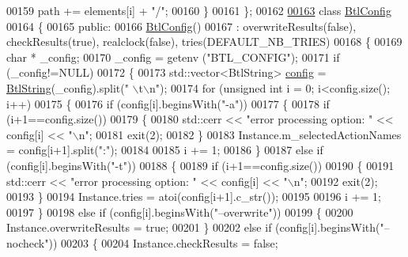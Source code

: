 \begin{DoxyCode}
00159             path += elements[i] + \textcolor{stringliteral}{"/"};
00160     \}
00161 \};
00162 
\hyperlink{class_btl_config}{00163} \textcolor{keyword}{class }\hyperlink{class_btl_config}{BtlConfig}
00164 \{
00165 \textcolor{keyword}{public}:
00166   \hyperlink{class_btl_config}{BtlConfig}()
00167     : overwriteResults(\textcolor{keyword}{false}), checkResults(\textcolor{keyword}{true}), realclock(\textcolor{keyword}{false}), tries(DEFAULT\_NB\_TRIES)
00168   \{
00169     \textcolor{keywordtype}{char} * \_config;
00170     \_config = getenv (\textcolor{stringliteral}{"BTL\_CONFIG"});
00171     \textcolor{keywordflow}{if} (\_config!=NULL)
00172     \{
00173       std::vector<BtlString> \hyperlink{structconfig__s}{config} = \hyperlink{class_btl_string}{BtlString}(\_config).split(\textcolor{stringliteral}{" \(\backslash\)t\(\backslash\)n"});
00174       \textcolor{keywordflow}{for} (\textcolor{keywordtype}{unsigned} \textcolor{keywordtype}{int} i = 0; i<config.size(); i++)
00175       \{
00176         \textcolor{keywordflow}{if} (config[i].beginsWith(\textcolor{stringliteral}{"-a"}))
00177         \{
00178           \textcolor{keywordflow}{if} (i+1==config.size())
00179           \{
00180             std::cerr << \textcolor{stringliteral}{"error processing option: "} << config[i] << \textcolor{stringliteral}{"\(\backslash\)n"};
00181             exit(2);
00182           \}
00183           Instance.m\_selectedActionNames = config[i+1].split(\textcolor{stringliteral}{":"});
00184 
00185           i += 1;
00186         \}
00187         \textcolor{keywordflow}{else} \textcolor{keywordflow}{if} (config[i].beginsWith(\textcolor{stringliteral}{"-t"}))
00188         \{
00189           \textcolor{keywordflow}{if} (i+1==config.size())
00190           \{
00191             std::cerr << \textcolor{stringliteral}{"error processing option: "} << config[i] << \textcolor{stringliteral}{"\(\backslash\)n"};
00192             exit(2);
00193           \}
00194           Instance.tries = atoi(config[i+1].c\_str());
00195 
00196           i += 1;
00197         \}
00198         \textcolor{keywordflow}{else} \textcolor{keywordflow}{if} (config[i].beginsWith(\textcolor{stringliteral}{"--overwrite"}))
00199         \{
00200           Instance.overwriteResults = \textcolor{keyword}{true};
00201         \}
00202         \textcolor{keywordflow}{else} \textcolor{keywordflow}{if} (config[i].beginsWith(\textcolor{stringliteral}{"--nocheck"}))
00203         \{
00204           Instance.checkResults = \textcolor{keyword}{false};

\end{DoxyCode}
